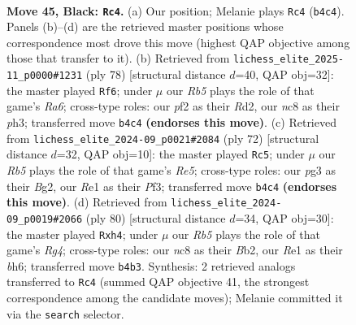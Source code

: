 \documentclass[11pt]{article}
\begin{document}
\clearpage

\begin{figure}[p]\centering
\begin{subfigure}{0.46\textwidth}\centering
\resizebox{\linewidth}{!}{%
\newchessgame
\chessboard[
  setfen={2N5/1p4bk/6p1/5p1p/Pr6/R4KPP/5P2/4r3 b - - 6 45},
  showmover=false,
  pgfstyle=straightmove, color=movearrow, markmove={b4-c4}
]}
\caption{}
\end{subfigure}\hfill
\begin{subfigure}{0.46\textwidth}\centering
\resizebox{\linewidth}{!}{%
\newchessgame
\chessboard[
  setfen={8/pr1k1p2/R7/3Prpp1/8/5PPp/3R1K1P/8 w - - 2 40},
  showmover=false,
  pgfstyle=straightmove, color=movearrow, markmove={a6-f6}
]}
\caption{}
\end{subfigure}
\\[4pt]
\begin{subfigure}{0.46\textwidth}\centering
\resizebox{\linewidth}{!}{%
\newchessgame
\chessboard[
  setfen={2b5/p4k1p/6p1/Pp2R1P1/1r3p1P/5P2/6BK/8 w - - 0 37},
  showmover=false,
  pgfstyle=straightmove, color=movearrow, markmove={e5-c5}
]}
\caption{}
\end{subfigure}\hfill
\begin{subfigure}{0.46\textwidth}\centering
\resizebox{\linewidth}{!}{%
\newchessgame
\chessboard[
  setfen={8/p3kp2/1p5b/2prP3/P5Rp/1P6/KBP5/8 w - - 0 41},
  showmover=false,
  pgfstyle=straightmove, color=movearrow, markmove={g4-h4}
]}
\caption{}
\end{subfigure}
\caption{\textbf{Move 45, Black: \texttt{Rc4}.} (a) Our position; Melanie plays \texttt{Rc4} (\texttt{b4c4}). Panels (b)--(d) are the retrieved master positions whose correspondence most drove this move (highest QAP objective among those that transfer to it). (b) Retrieved from \texttt{lichess\_elite\_2025-11\_p0000\#1231} (ply 78) [structural distance $d$=40, QAP obj=32]: the master played \texttt{Rf6}; under $\mu$ our \emph{Rb5} plays the role of that game's \emph{Ra6}; cross-type roles: our \emph{p}f2 as their \emph{R}d2, our \emph{n}c8 as their \emph{p}h3; transferred move \texttt{b4c4} \textbf{(endorses this move)}. (c) Retrieved from \texttt{lichess\_elite\_2024-09\_p0021\#2084} (ply 72) [structural distance $d$=32, QAP obj=10]: the master played \texttt{Rc5}; under $\mu$ our \emph{Rb5} plays the role of that game's \emph{Re5}; cross-type roles: our \emph{p}g3 as their \emph{B}g2, our \emph{R}e1 as their \emph{P}f3; transferred move \texttt{b4c4} \textbf{(endorses this move)}. (d) Retrieved from \texttt{lichess\_elite\_2024-09\_p0019\#2066} (ply 80) [structural distance $d$=34, QAP obj=30]: the master played \texttt{Rxh4}; under $\mu$ our \emph{Rb5} plays the role of that game's \emph{Rg4}; cross-type roles: our \emph{n}c8 as their \emph{B}b2, our \emph{R}e1 as their \emph{b}h6; transferred move \texttt{b4b3}. Synthesis: 2 retrieved analogs transferred to \texttt{Rc4} (summed QAP objective 41, the strongest correspondence among the candidate moves); Melanie committed it via the \texttt{search} selector.}
\label{fig:thought-m89}
\end{figure}
\end{document}
